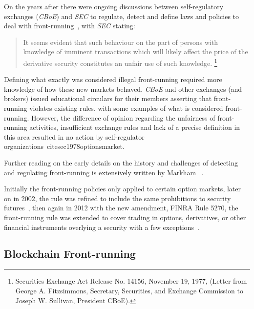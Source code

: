 
On the years after there were ongoing discussions between self-regulatory exchanges (\eg \textit{CBoE}) and \textit{SEC} to regulate, detect and define laws and policies to deal with front-running~\cite{markham1988front}, with \textit{SEC} stating: 
\begin{quote}
It seems evident that such behaviour on the part of persons with knowledge of imminent transactions which will likely affect the price of the derivative security constitutes an unfair use of such knowledge. \footnote{Securities Exchange Act Release No. 14156, November 19, 1977, (Letter from George A. Fitzsimmons, Secretary, Securities, and Exchange Commission to Joseph W. Sullivan, President  CBoE).}
\end{quote} 

Defining what exactly was considered illegal front-running required more knowledge of how these new markets behaved. \textit{CBoE} and other exchanges (and brokers) issued educational circulars for their members asserting that front-running violates existing rules, with some examples of what is considered front-running. However, the difference of opinion regarding the unfairness of front-running activities, insufficient exchange rules and lack of a precise definition in this area resulted in no action by self-regulator organizations~cite{sec1978optionsmarket}. 

Further reading on the early details on the history and challenges of detecting and regulating front-running is extensively written by Markham~\cite{markham1988front} . %

Initially the front-running policies only applied to certain option markets, later on in 2002, the rule was refined to include the same prohibitions to security futures~\cite{finra_2002},  then again in 2012 with the new amendment, FINRA Rule 5270, the front-running rule was extended to cover trading in options, derivatives, or other financial instruments overlying a security with a few exceptions~\cite{sec2012frontrunning, finra_2012}.


\subsection{Blockchain Front-running} \label{sec:Front Running on the Blockchains}

